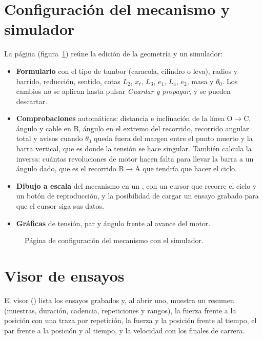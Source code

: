 \section{Configuración del mecanismo y simulador}

La página  (figura~\ref{fig:sim}) reúne la edición de la geometría y un simulador:

\begin{itemize}
  \item \textbf{Formulario} con el tipo de tambor (caracola, cilindro o leva), radios y barrido,
        reducción, sentido, cotas $L_2$, $x_t$, $L_3$, $e_1$, $L_4$, $e_2$, masa y $\theta_0$. Los
        cambios no se aplican hasta pulsar \emph{Guardar y propagar}, y se pueden descartar.
  \item \textbf{Comprobaciones} automáticas: distancia e inclinación de la línea O$\to$C, ángulo y
        cable en B, ángulo en el extremo del recorrido, recorrido angular total y avisos cuando
        $\theta_0$ queda fuera del margen entre el punto muerto y la barra vertical, que es donde la
        tensión se hace singular.
        También calcula la inversa: cuántas revoluciones de motor hacen falta para llevar la barra a
        un ángulo dado, que es el recorrido B$\rightarrow$A que tendría que hacer el ciclo.
  \item \textbf{Dibujo a escala} del mecanismo en un , con un cursor que recorre el
        ciclo y un botón de reproducción, y la posibilidad de cargar un ensayo grabado para que el
        cursor siga sus datos.
  \item \textbf{Gráficas} de tensión, par y ángulo frente al avance del motor.
\end{itemize}


\begin{figure}[H]
\centering
{}
\caption{Página de configuración del mecanismo con el simulador.}
\label{fig:sim}
\end{figure}

\section{Visor de ensayos}

El visor () lista los ensayos grabados y, al abrir uno, muestra un resumen
(muestras, duración, cadencia, repeticiones y rangos), la fuerza frente a la posición con una traza
por repetición, la fuerza y la posición frente al tiempo, el par frente a la posición y al tiempo, y
la velocidad con los finales de carrera.


